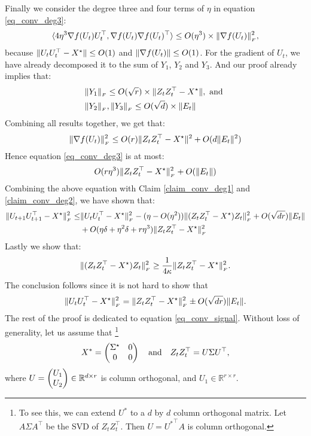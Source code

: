 		Finally we consider the degree three and four terms of $\eta$ in equation \eqref{eq_conv_deg3}:
	\begin{align*}
		\langle4\eta^3 \nabla f(U_t) U_t^{\top}, \nabla f(U_t)\nabla f(U_t)^{\top}\rangle
		\le O(\eta^3) \times \|\nabla f(U_t)\|_{_{F}}^2,
	\end{align*}
	because $\|U_tU_t^{\top} - {X}^\star\| \le O(1)$ and $\|\nabla f(U_t)\| \le O(1)$. For the gradient of $U_t$, we have already decomposed it to the sum of $Y_1$, $Y_2$ and $Y_3$.
	And our proof already implies that:
	\begin{align*}
		&	\|Y_1\|_{_{F}} \le O(\sqrt r) \times \|Z_tZ_t^{\top} - {X}^\star\|, \mbox{ and }\\
		& \|Y_2\|_{_{F}}, \|Y_3\|_{_{F}} \le O(\sqrt d) \times \|E_t\|
	\end{align*}
	Combining all results together, we get that:
	\[ \|\nabla f(U_t)\|_{_{F}}^2 \le O(r) \|Z_tZ_t^{\top} - {X}^\star\|^2 + O(d \|E_t\|^2) \]
	Hence equation \eqref{eq_conv_deg3} is at most:
	\[ O(r \eta^3) \|Z_tZ_t^{\top} - {X}^\star\|_{_{F}}^2 + O(\|E_t\|) \]
	Combining the above equation with Claim \ref{claim_conv_deg1} and \ref{claim_conv_deg2}, we have shown that:
	\begin{align*}
		\|U_{t+1}U_{t+1}^{\top} - {X}^\star\|_{_{F}}^2
		\le & \|U_tU_t^{\top} - {X}^\star\|_{_{F}}^2 - (\eta - O(\eta^2)) \|(Z_tZ_t^{\top} - {X}^\star)Z_t\|_{_{F}}^2 + O(\sqrt{dr}) \|E_t\| \\
		& + O(\eta\delta + \eta^2\delta + r\eta^3) \|Z_tZ_t^{\top} - {X}^\star\|_{_{F}}^2
	\end{align*}
	Lastly we show that:
	\begin{align}\label{eq_conv_signal}
		\|(Z_tZ_t^{\top} - {X}^\star)Z_t\|_{_{F}}^2 \ge \frac 1 {4\kappa} \|Z_tZ_t^{\top} - {X}^\star\|_{_{F}}^2.
	\end{align}
	The conclusion follows since it is not hard to show that
	\[ \|U_tU_t^{\top} - {X}^\star\|_{_{F}}^2 = \|Z_tZ_t^{\top} - {X}^\star\|_{_{F}}^2 \pm O(\sqrt{dr}) \|E_t\|. \]
The rest of the proof is dedicated to equation \eqref{eq_conv_signal}.
Without loss of generality, let us assume that
\footnote{To see this, we can extend $U^*$ to a $d$ by $d$ column orthogonal matrix. Let $A\Sigma A^{\top}$ be the SVD of $Z_tZ_t^{\top}$. Then $U = {U^*}^{\top} A$ is column orthogonal.}
\[ {X}^* = \begin{pmatrix} {{\Sigma}^\star} & 0 \\ 0 & 0\end{pmatrix} \quad \text{and} \quad Z_t Z_t^{\top} = U {\Sigma} U^{\top}, \]
where $U = \begin{pmatrix} U_1 \\ U_2\end{pmatrix} \in \mathbb{R}^{d \times r}$ is column orthogonal, and $U_1 \in \mathbb{R}^{r \times r}$.
